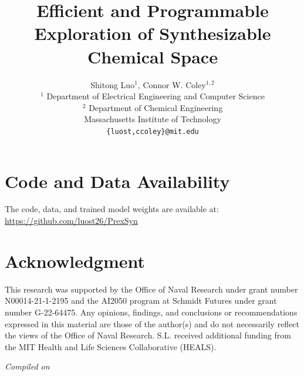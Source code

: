 \documentclass{techreport}
\title{Efficient and Programmable Exploration of Synthesizable Chemical Space}
\author{Shitong Luo$^1$, Connor W. Coley$^{1,2}$\\
\vspace{1em}
\normalfont
$^1$ Department of Electrical Engineering and Computer Science \\
$^2$ Department of Chemical Engineering \\
Massachusetts Institute of Technology \\
\texttt{\{luost,ccoley\}@mit.edu} \\
\vspace{1em}
}
\begin{document}
\maketitle
\thispagestyle{firstpagestyle}








\section*{Code and Data Availability}
The code, data, and trained model weights are available at: \\\url{https://github.com/luost26/PrexSyn}

\section*{Acknowledgment}
This research was supported by the Office of Naval Research under grant number N00014-21-1-2195 and the AI2050 program at Schmidt Futures under grant number G-22-64475. Any opinions, findings, and conclusions or recommendations expressed in this material are those of the author(s) and do not necessarily reflect the views of the Office of Naval Research. S.L. received additional funding from the MIT Health and Life Sciences Collaborative (HEALS).




\vspace{1em}
{\it Compiled on \DTMnow}

% 
\end{document}
